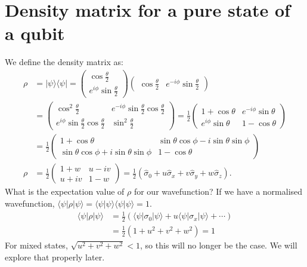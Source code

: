 \documentclass[a4paper, 11pt, normalem]{report}
\begin{document}
\section{Density matrix for a pure state of a qubit}
We define the density matrix as:
\begin{align}
    \rho &= |\psi\rangle\langle\psi| = \begin{pmatrix} \cos\frac{\theta}{2} \\ e^{i\phi}\sin\frac{\theta}{2}\end{pmatrix}\begin{pmatrix} \cos\frac{\theta}{2} & e^{-i\phi}\sin\frac{\theta}{2}\end{pmatrix}  \\
                                    &= \begin{pmatrix} \cos^2\frac{\theta}{2} & e^{-i\phi}\sin\frac{\theta}{2}\cos\frac{\theta}{2} \\ e^{i\phi}\sin\frac{\theta}{2}\cos\frac{\theta}{2} & \sin^2\frac{\theta}{2}\end{pmatrix} = \frac12 \begin{pmatrix} 1+\cos\theta & e^{-i\phi}\sin\theta \\ e^{i\phi}\sin\theta & 1-\cos\theta\end{pmatrix} \\
                                    &= \frac12 \begin{pmatrix} 1+\cos\theta & \sin\theta\cos\phi - i\sin\theta\sin\phi \\ \sin\theta\cos\phi + i\sin\theta\sin\phi & 1-\cos\theta\end{pmatrix} \\
    \rho &= \frac12\begin{pmatrix} 1+w & u-iv \\ u+iv & 1-w\end{pmatrix} = \frac12\left(\hat{\sigma}_0 + u\hat{\sigma}_x + v\hat{\sigma}_y + w\hat{\sigma}_z\right).
\end{align}
What is the expectation value of $\rho$ for our wavefunction?
If we have a normalised wavefunction, $\langle\psi|\rho|\psi\rangle = \langle\psi|\psi\rangle\langle\psi|\psi\rangle = 1$.
\begin{align}
    \langle\psi|\rho|\psi\rangle &= \frac12\left(\langle\psi|\sigma_0|\psi\rangle + u\langle\psi|\sigma_x|\psi\rangle + \cdots\right) \\
                                 &= \frac12\left(1 + u^2 + v^2 + w^2\right) = 1
\end{align}
For mixed states, $\sqrt{u^2+v^2+w^2}<1$, so this will no longer be the case.
We will explore that properly later.
\end{document}
